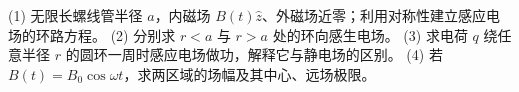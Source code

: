 (1) 无限长螺线管半径 \(a\)，内磁场 \(B(t)\hat z\)、外磁场近零；利用对称性建立感应电场的环路方程。
(2) 分别求 \(r<a\) 与 \(r>a\) 处的环向感生电场。
(3) 求电荷 \(q\) 绕任意半径 \(r\) 的圆环一周时感应电场做功，解释它与静电场的区别。
(4) 若 \(B(t)=B_0\cos\omega t\)，求两区域的场幅及其中心、远场极限。
